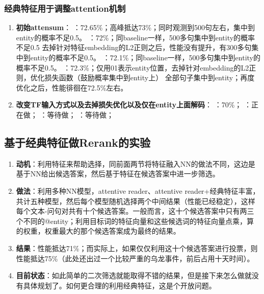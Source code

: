 \documentclass[11pt]{article}
\begin{document}
\subsubsection{经典特征用于调整attention机制}
\begin{enumerate}
    \item  {\bf  初始attensum}：
        ：72.65\%；高峰抵达73\%；同时观测到500句左右，集中到entity的概率不足0.5。
        ：72\%；同baseline一样，500多句集中到entity的概率不足0.5	去掉针对特征embedding的L2正则之后，性能没有提升，有300多句集中到entity的概率不足0.5。
        ：72.1\%；同baseline一样，500多句集中到entity的概率不足0.5。
        ：72.3\%；仅用01表示entity位置，去掉针对embedding的L2正则，优化损失函数（鼓励概率集中到entity上）	全部句子集中到entity；再度优化之后，性能徘徊在72.5\%左右。
    \item  {\bf  改变TF输入方式以及去掉损失优化以及仅在entity上面解码}：
        ：70\%；
        ：正在做；
        ：等待做；
        ：等待做；
\end{enumerate}

\subsection{基于经典特征做Rerank的实验}
\begin{enumerate}
    \item  {\bf  动机}：利用特征来帮助选择，同前面两节将特征融入NN的做法不同，这边是基于NN给出候选答案，然后基于特征在候选答案中进一步筛选。
    \item  {\bf  做法}：利用多种NN模型，attentive reader、attentive reader+经典特征丰富，共计五种模型，然后每个模型随机选择两个中间结果（性能已经稳定），这样每个文本-问句对共有十个候选答案。一般而言，这十个候选答案中只有两三个不同的@entity；利用目标词的特征向量和这些候选词的特征向量点乘，算的权重，权重最大的那个候选答案成为最终的结果。
    \item  {\bf  结果}：性能抵达71\%；而实际上，如果仅仅利用这十个候选答案进行投票，则性能抵达75\%（此处还出过一个比较严重的乌龙事件，前后占用十天时间）。
    \item  {\bf  目前状态}：如此简单的二次筛选就能取得不错的结果，但是接下来怎么做就没有具体规划了。如何更合理的利用经典特征，这是个开放问题。
\end{enumerate}
\end{document}
